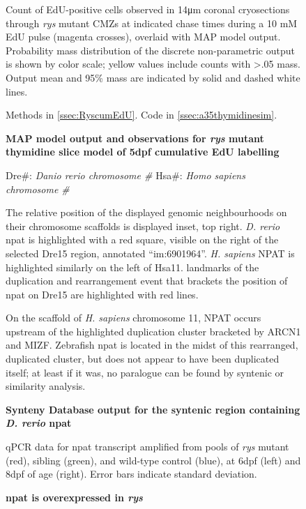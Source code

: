 \begin{figure}[!h]
    \caption{{\bf MAP model output and observations for \textit{rys} mutant thymidine slice model of 5dpf cumulative EdU labelling}}
    Count of EdU-positive cells observed in 14\si{\micro\metre} coronal cryosections through \textit{rys} mutant CMZs at indicated chase times during a 10 mM EdU pulse (magenta crosses), overlaid with MAP model output. Probability mass distribution of the discrete non-parametric output is shown by color scale; yellow values include counts with >.05 mass. Output mean and 95\% mass are indicated by solid and dashed white lines.

    Methods in \autoref{ssec:RyscumEdU}. Code in \autoref{ssec:a35thymidinesim}.
    \label{a35rysMAP}
\end{figure}

\begin{sidewaysfigure}[!h]
    \caption{{\bf Synteny Database output for the syntenic region containing \textit{D. rerio} npat}}
    Dre\#: \textit{Danio rerio chromosome \#}
    Hsa\#: \textit{Homo sapiens chromosome \#}

    The relative position of the displayed genomic neighbourhoods on their chromosome scaffolds is displayed inset, top right. \textit{D. rerio} npat is highlighted with a red square, visible on the right of the selected Dre15 region, annotated ``im:6901964''. \textit{H. sapiens} NPAT is highlighted similarly on the left of Hsa11. landmarks of the duplication and rearrangement event that brackets the position of npat on Dre15 are highlighted with red lines.

    On the scaffold of \textit{H. sapiens} chromosome 11, NPAT occurs upstream of the highlighted duplication cluster bracketed by ARCN1 and MIZF. Zebrafish npat is located in the midst of this rearranged, duplicated cluster, but does not appear to have been duplicated itself; at least if it was, no paralogue can be found by syntenic or similarity analysis.
    \label{synteny}
\end{sidewaysfigure}

\begin{figure}[!h]
    \caption{{\bf npat is overexpressed in \textit{rys}}}
    qPCR data for npat transcript amplified from pools of \textit{rys} mutant (red), sibling (green), and wild-type control (blue), at 6dpf (left) and 8dpf of age (right). Error bars indicate standard deviation. 
    \label{npatrtpcr}
\end{figure}

